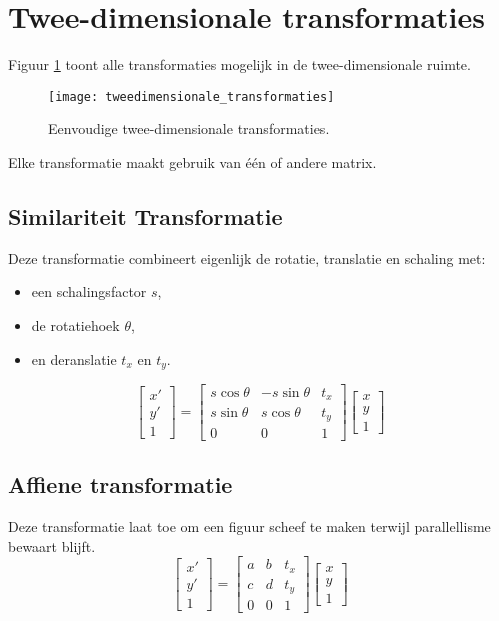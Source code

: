 \section{Twee-dimensionale transformaties}
Figuur \ref{fig:tweedimensionale_transformaties} toont alle transformaties mogelijk in de twee-dimensionale ruimte. 
\begin{figure}[h]
	\texttt{[image: tweedimensionale\_transformaties]}
	\caption{Eenvoudige twee-dimensionale transformaties.}
	\label{fig:tweedimensionale_transformaties}
\end{figure}
Elke transformatie maakt gebruik van één of andere matrix. 
\subsection{Similariteit Transformatie}
Deze transformatie combineert eigenlijk de rotatie, translatie en schaling met:
\begin{itemize}
	\item een schalingsfactor $s$,
	\item de rotatiehoek $\theta$,
	\item en deranslatie $t_x$ en $t_y$.
\end{itemize}
$$\begin{bmatrix}
x' \\ y' \\ 1
\end{bmatrix}
=
\begin{bmatrix}
s\cos\theta & -s\sin\theta & t_x \\
s\sin\theta & s\cos\theta & t_y \\
0 & 0 & 1
\end{bmatrix}
\begin{bmatrix}
x \\ y \\ 1
\end{bmatrix}$$

\subsection{Affiene transformatie}
Deze transformatie laat toe om een figuur scheef te maken terwijl parallellisme bewaart blijft.
$$\begin{bmatrix}
x' \\ y' \\ 1
\end{bmatrix}
=
\begin{bmatrix}
a & b & t_x \\
c & d & t_y \\
0 & 0 & 1
\end{bmatrix}
\begin{bmatrix}
x \\ y \\ 1
\end{bmatrix}$$


